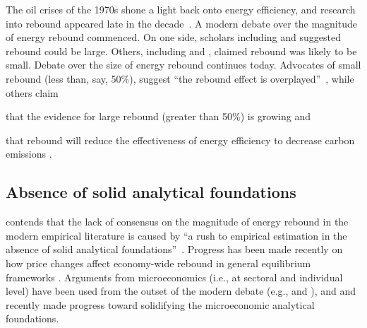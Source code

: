 \documentclass[12pt]{article}\usepackage[]{graphicx}\usepackage[]{xcolor}
\begin{document}
The oil crises of the 1970s shone a light back onto energy efficiency, and 
research into rebound appeared late in the decade~\citep{Madlener:2016to, Saunders:2021te}. 
A modern debate over the magnitude of energy rebound commenced. 
On one side, scholars including \citet{Brookes1979, Brookes1990} and \citet{Khazzoom1980} 
suggested rebound could be large.
Others, including \citet{Lovins1988} and \citet{Grubb1990, Grubb1992},
claimed rebound was likely to be small.
Debate over the size of energy rebound continues today.
Advocates of small rebound (less than, say, 50\%),
suggest ``the rebound effect is overplayed''~\citep[p.~475]{Gillingham:2013aa},
while others claim
%
\begin{enumerate*}[label={(\roman*)}]
	
  \item that the evidence for large rebound
        (greater than 50\%) is growing 
        \citep{Saunders2015, Berner:2022tb} and
  
  \item that rebound will reduce the effectiveness of energy efficiency
        to decrease carbon emissions
        \citep{van-den-Bergh:2017aa}.
    
\end{enumerate*}


\subsection{Absence of solid analytical foundations}
\label{sec:absence_of_foundations}

\citeauthor{Turner:2013aa} contends that the lack of consensus 
on the magnitude of energy rebound 
in the modern empirical literature is caused by 
``a rush to empirical estimation in the absence 
of solid analytical foundations''~\citep[p.~25]{Turner:2013aa}.
Progress has been made recently on how price changes 
affect economy-wide rebound 
in general equilibrium frameworks
\citep{Lemoine:2020aa, Fullerton2020, blackburn2020energy}.
Arguments from microeconomics (i.e., at sectoral and individual level) have
been used from the outset of the modern debate 
(e.g., \citet{Khazzoom1980} and \citet{Greening2000}),
and \citet{Borenstein:2015aa} and \citet{Chan2015}
recently made progress toward solidifying the microeconomic analytical foundations. 
\end{document}
